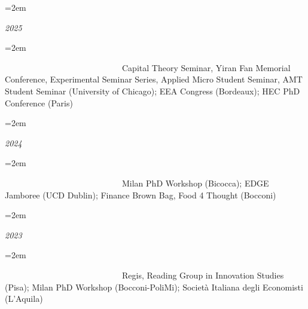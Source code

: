 \documentclass{scrartcl}
\newcommand{\MarginText}[1]{\marginpar{\raggedleft\itshape\small#1}} %
\newlength{\datebox}\settowidth{\datebox}{Spring 2011} %
\newcommand{\NewEntry}[3]{\noindent\hangindent=2em\hangafter=0 \parbox{\datebox}{\small \textit{#1}}\hspace{1.5em} #2 #3 %
\vspace{0.5em}} %
\newcommand{\Description}[1]{\hangindent=2em\hangafter=0\noindent\raggedright\footnotesize{#1}\par\normalsize\vspace{1em}} %
\begin{document}
\begin{cv}{}





\vspace{1em}

\NewEntry{2025}{}

\vspace{-1.5em}
\Description{\MarginText{}
\ \ \ \ \ \ \ \ \ \ \ \ \ \ \ \ \ \ \ \  \ \ \ \ \ \ \ \  {Capital Theory Seminar, Yiran Fan Memorial Conference, Experimental Seminar Series, Applied Micro Student Seminar, AMT Student Seminar (University of Chicago); EEA Congress (Bordeaux); HEC PhD Conference (Paris)}}%



\NewEntry{2024}{}

\vspace{-1.5em}
\Description{\MarginText{}
\ \ \ \ \ \ \ \ \ \ \ \ \ \ \ \ \ \ \ \  \ \ \ \ \ \ \ \  {Milan PhD Workshop (Bicocca); EDGE Jamboree (UCD Dublin); Finance Brown Bag, Food 4 Thought (Bocconi)}}%


\NewEntry{2023}{}

\vspace{-1.5em}
\Description{\MarginText{}  
\ \ \ \ \ \ \ \ \ \ \ \ \ \ \ \ \ \ \ \  \ \ \ \ \ \ \ \  {Regis, Reading Group in Innovation Studies (Pisa); Milan PhD Workshop (Bocconi-PoliMi); Società Italiana degli Economisti (L'Aquila)}}%





\end{cv}
\end{document}
